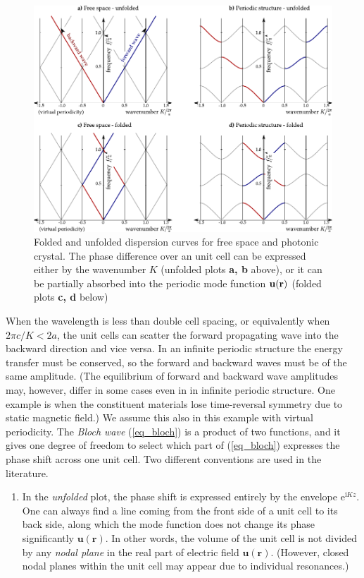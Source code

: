 {\begin{figure}[ht] \caption{Folded and unfolded dispersion curves for free space and photonic crystal. The phase difference over an unit cell can be expressed either by the wavenumber $K$ (unfolded plots \textbf{a, b} above), or it can be partially absorbed into the periodic mode function $\mathbf{u}({\mathbf{r}})$ (folded plots \textbf{c, d} below) } \label{fg_phc} \centering  %
	\includegraphics[width=17cm]{img/PhC_folding_illustration.pdf} 
\end{figure}
When the wavelength is less than double cell spacing, or equivalently when $2\pi c /K < 2 a$, the unit cells can scatter the forward propagating wave into the backward direction and vice versa. In an infinite periodic structure the energy transfer must be conserved, so the forward and backward waves must be of the same amplitude. (The equilibrium of forward and backward wave amplitudes may, however, differ in some cases even in in infinite periodic structure. One example is when the constituent materials lose time-reversal symmetry due to static magnetic field.) We assume this also in this example with virtual periodicity. The \textit{Bloch wave} (\ref{eq_bloch}) is a product of two functions, and it gives one degree of freedom to select which part of (\ref{eq_bloch}) expresses the phase shift across one unit cell. Two different conventions are used in the literature.
\begin{enumerate}
 \item{In the \textit{unfolded} plot, the phase shift is expressed entirely by the envelope $\mathrm{e}^{\mathrm{i}Kz}$. One can always find a line coming from the front side of a unit cell to its back side, along which the mode function does not change its phase significantly $\mathbf{u(\mathbf{r})}$. In other words, the volume of the unit cell is not divided by any \textit{nodal plane} in the real part of electric field  $\mathbf{u(\mathbf{r})}$. (However, closed nodal planes within the unit cell may appear due to individual resonances.)

}
\end{enumerate}}
